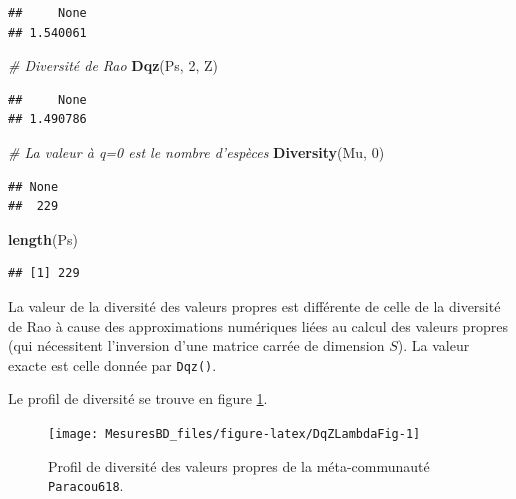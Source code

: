 \documentclass[
  11pt,
  french,
  a4paper,
  extrafontsizes,onecolumn,openright
  ]{memoir}
\newenvironment{Shaded}{\begin{snugshade}}{\end{snugshade}}
\newcommand{\CommentTok}[1]{\textcolor[rgb]{0.56,0.35,0.01}{\textit{#1}}}
\newcommand{\DecValTok}[1]{\textcolor[rgb]{0.00,0.00,0.81}{#1}}
\newcommand{\KeywordTok}[1]{\textcolor[rgb]{0.13,0.29,0.53}{\textbf{#1}}}
\newcommand{\NormalTok}[1]{#1}
\begin{document}
\begin{verbatim}
##     None 
## 1.540061
\end{verbatim}

\begin{Shaded}
\begin{Highlighting}[]
\CommentTok{# Diversité de Rao}
\KeywordTok{Dqz}\NormalTok{(Ps, }\DecValTok{2}\NormalTok{, Z)}
\end{Highlighting}
\end{Shaded}

\begin{verbatim}
##     None 
## 1.490786
\end{verbatim}

\begin{Shaded}
\begin{Highlighting}[]
\CommentTok{# La valeur à q=0 est le nombre d'espèces}
\KeywordTok{Diversity}\NormalTok{(Mu, }\DecValTok{0}\NormalTok{)}
\end{Highlighting}
\end{Shaded}

\begin{verbatim}
## None 
##  229
\end{verbatim}

\begin{Shaded}
\begin{Highlighting}[]
\KeywordTok{length}\NormalTok{(Ps)}
\end{Highlighting}
\end{Shaded}

\begin{verbatim}
## [1] 229
\end{verbatim}

\normalsize

La valeur de la diversité des valeurs propres est différente de celle de la diversité de Rao à cause des approximations numériques liées au calcul des valeurs propres (qui nécessitent l'inversion d'une matrice carrée de dimension \(S\)).
La valeur exacte est celle donnée par \texttt{Dqz()}.

Le profil de diversité se trouve en figure \ref{fig:DqZLambdaFig}.



\scriptsize

\begin{figure}

{\centering \texttt{[image: MesuresBD\_files/figure-latex/DqZLambdaFig-1]} 

}

\caption{Profil de diversité des valeurs propres de la méta-communauté \texttt{Paracou618}.}\label{fig:DqZLambdaFig}
\end{figure}
\end{document}
